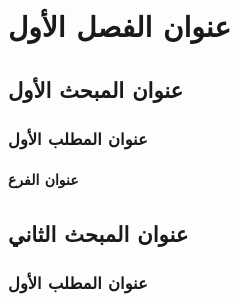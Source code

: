 
\chapter{عنوان الفصل الأول}


\section{عنوان المبحث الأول}
\subsection{عنوان المطلب الأول}
\subsubsection{عنوان الفرع}


\section{عنوان المبحث الثاني}
\subsection{عنوان المطلب الأول}



